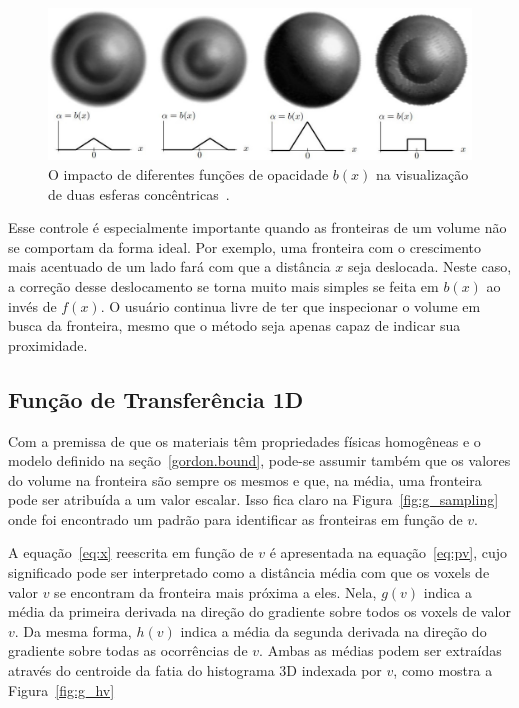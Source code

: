 \begin{figure}[h]
	\centering
	\includegraphics[width=1\textwidth]{images/g_bx}
	\caption{O impacto de diferentes funções de opacidade $b(x)$ na visualização de duas esferas concêntricas~\cite{gordon}.}
	\label{fig:g_bx}
\end{figure}

	Esse controle é especialmente importante quando as fronteiras de um volume não se comportam da forma ideal. Por exemplo, uma fronteira com o crescimento mais acentuado de um lado fará com que a distância $x$ seja deslocada. Neste caso, a correção desse deslocamento se torna muito mais simples se feita em $b(x)$ ao invés de $f(x)$. O usuário continua livre de ter que inspecionar o volume em busca da fronteira, mesmo que o método seja apenas capaz de indicar sua proximidade.
	
\subsection{Função de Transferência 1D}
\label{gordon.1d}
	Com a premissa de que os materiais têm propriedades físicas homogêneas e o modelo definido na seção~\ref{gordon.bound}, pode-se assumir também que os valores do volume na fronteira são sempre os mesmos e que, na média, uma fronteira pode ser atribuída a um valor escalar. Isso fica claro na Figura~\ref{fig:g_sampling} onde foi encontrado um padrão para identificar as fronteiras em função de $v$.
	
	A equação~\eqref{eq:x} reescrita em função de $v$ é apresentada na equação~\eqref{eq:pv}, cujo significado pode ser interpretado como a distância média com que os voxels de valor $v$ se encontram da fronteira mais próxima a eles. Nela, $g(v)$ indica a média da primeira derivada na direção do gradiente sobre todos os voxels de valor $v$. Da mesma forma, $h(v)$ indica a média da segunda derivada na direção do gradiente sobre todas as ocorrências de $v$. Ambas as médias podem ser extraídas através do centroide da fatia do histograma 3D indexada por $ v $, como mostra a Figura~\ref{fig:g_hv}
	
